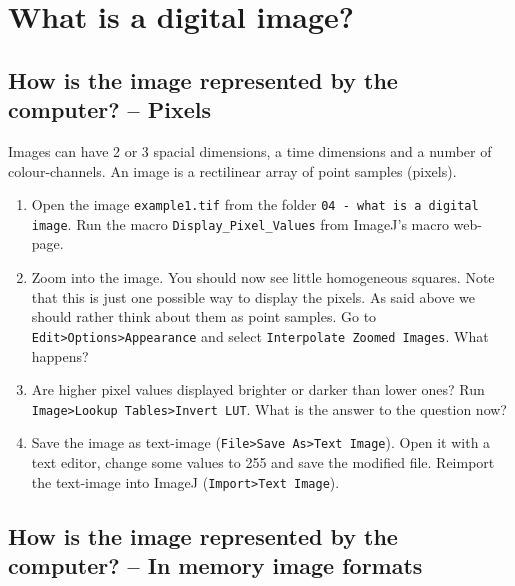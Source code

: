 \chapter{What is a digital image?}

\section{How is the image represented by the computer? -- Pixels}

Images can have 2 or 3 spacial dimensions, a time dimensions and a number of colour-channels. An image is a rectilinear array of point samples (pixels).

\begin{enumerate}
\item Open the image \texttt{example1.tif} from the folder \texttt{04 - what is a digital image}. Run the macro \texttt{Display\_Pixel\_Values} from ImageJ's macro web-page. 

\item Zoom into the image. You should now see little homogeneous squares. Note that this is just one possible way to display the pixels. As said above we should rather think about them as point samples. Go to \texttt{Edit>Options>Appearance} and select \texttt{Interpolate Zoomed Images}. What happens?

\fbox{
	\begin{minipage}{\linewidth}
		\hfill\vspace{2cm}
	\end{minipage}
	}

\item Are higher pixel values displayed brighter or darker than lower ones? Run \texttt{Image>Lookup Tables>Invert LUT}. What is the answer to the question now?

\fbox{
	\begin{minipage}{\linewidth}
		\hfill\vspace{2cm}
	\end{minipage}
	}
	
\item Save the image as text-image (\texttt{File>Save As>Text Image}). Open it with a text editor, change some values to 255 and save the modified file. Reimport the text-image into ImageJ
(\texttt{Import>Text Image}).
\end{enumerate}

\section{How is the image represented by the computer? -- In memory image formats}

